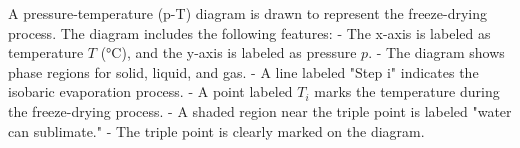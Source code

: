 A pressure-temperature (p-T) diagram is drawn to represent the freeze-drying process. The diagram includes the following features:  
- The x-axis is labeled as temperature \( T \) (°C), and the y-axis is labeled as pressure \( p \).  
- The diagram shows phase regions for solid, liquid, and gas.  
- A line labeled "Step i" indicates the isobaric evaporation process.  
- A point labeled \( T_i \) marks the temperature during the freeze-drying process.  
- A shaded region near the triple point is labeled "water can sublimate."  
- The triple point is clearly marked on the diagram.